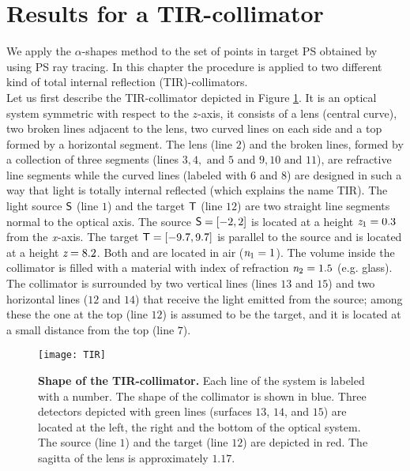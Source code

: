 \section{Results for a TIR-collimator}\label{sec:results-Tir-alpha}
We apply the $\alpha$-shapes method to the set of points in target PS obtained by using PS ray tracing.
In this chapter the procedure is applied to two different kind of total internal reflection (TIR)-collimators.\\ \indent  
Let us first describe the TIR-collimator depicted in Figure \ref{fig:tir}. It is an optical system symmetric with respect to the $z$-axis, it consists of a lens (central curve), two broken lines adjacent to the lens,
two curved lines on each side and a top formed by a horizontal segment. The lens (line $2$) and the broken lines, formed by a collection of three segments (lines $3, 4, \mbox{ and } 5$ and $9, 10 \mbox{ and } 11$), are refractive line segments while the curved lines (labeled with $6$ and $8$) are designed in such a way that light is totally internal reflected (which explains the name TIR).
The light source $\textsf{S}$ (line $1$) and the target $\textsf{T}$ (line $12$) are two straight line segments normal to the optical axis.
The source $\textsf{S}= [-2,2]$ is located at a height $\textit{z}_{1} = 0.3$ from the $\textit{x}$-axis.
 The target $\textsf{T}= [-9.7, 9.7]$ is parallel to the source and is located at a height $ \textit{z}= 8.2$. Both  and  are located in air ($\textit{n}_1=1$).
The volume inside the collimator is filled with a material with index of refraction $\textit{n}_2=1.5$ (e.g. glass).
The collimator is surrounded by two vertical lines (lines $13$ and $15$) and two horizontal lines ($12$ and $14$) that receive the light emitted from the source; among these the one at the top (line $12$) is assumed to be the target, and it is located at a small distance from the top (line $7$). 
\begin{figure}[h]
  \begin{center}
  \texttt{[image: TIR]}
  \end{center}
  \caption{\textbf{Shape of the TIR-collimator.} Each line of the system is labeled with a number.
   The shape of the collimator is shown in blue.
   Three detectors depicted with green lines (surfaces $13$, $14$, and $15$) are located at the left, the right and the bottom of the optical system. The source (line $1$) and the target (line $12$) are depicted in red.
The sagitta of the lens is approximately $1.17$.}
  \label{fig:tir}
\end{figure}
